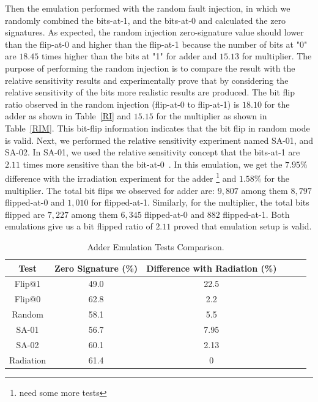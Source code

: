 Then the emulation performed with the random fault injection, in which we randomly combined the bits-at-1, and the bits-at-0 and calculated the zero signatures. As expected, the random injection zero-signature value should lower than the flip-at-0 and higher than the flip-at-1 because the number of bits at "0" are $18.45$ times higher than the bits at "1" for adder and  $15.13$ for multiplier. The purpose of performing the random injection is to compare the result with the relative sensitivity results and experimentally prove that by considering the relative sensitivity of the bits more realistic results are produced. The bit flip ratio observed in the random injection (flip-at-0 to flip-at-1) is $18.10$ for the adder as shown in Table~\ref{RI} and $15.15$ for the multiplier as shown in Table~\ref{RIM}. This bit-flip information indicates that the bit flip in random mode is valid. Next, we performed the relative sensitivity experiment named SA-01, and SA-02.
In SA-01, we used the relative sensitivity concept that the  bits-at-1 are $2.11$ times more sensitive than the bit-at-0~\citep{souari2016towards}. In this emulation, we get the $7.95\%$ difference with the irradiation experiment for the adder \footnote{need some more tests} and $1.58\%$ for the multiplier. The total bit flips we observed for adder are: $9,807$ among them $8,797$ flipped-at-0 and $1,010$ for flipped-at-1. Similarly, for the multiplier, the total bits flipped are $7,227$ among them $6,345$ flipped-at-0 and $882$ flipped-at-1. Both emulations give us a bit flipped ratio of $2.11$ proved that emulation setup is valid. 





\begin{table}[tb!]
\center
\caption{Adder Emulation Tests Comparison.}
\label{AE}
\begin{tabular}{|c | c| c | c| c| c |} 
 \hline
Test & Zero Signature (\%) & Difference with Radiation (\%)   \\ 
\hline
 
 
 Flip@1& 49.0 &22.5   \\
 \hline
 Flip@0 & 62.8 & 2.2 \\ 
 \hline
 
 Random & 58.1 & 5.5  \\
 \hline
 SA-01 & 56.7 & 7.95\\
 \hline
 SA-02 & 60.1 & 2.13 \\
 \hline
 Radiation & 61.4 & 0  \\
 \hline
 
 
\end{tabular}
\end{table}

